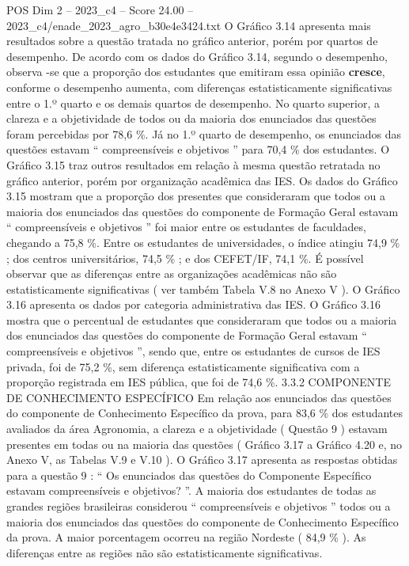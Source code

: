 \begin{textsample}{POS Dim 2 – 2023\_c4 – Score 24.00 – 2023\_c4/enade\_2023\_agro\_b30e4e3424.txt}
O Gráfico 3.14 apresenta mais resultados sobre a questão tratada no gráfico anterior, porém por quartos de desempenho.
De acordo com os dados do Gráfico 3.14, segundo o desempenho, observa -se que a proporção dos estudantes que emitiram essa opinião \textbf{cresce}, conforme o desempenho aumenta, com diferenças estatisticamente significativas entre o 1.º quarto e os demais quartos de desempenho.
No quarto superior, a clareza e a objetividade de todos ou da maioria dos enunciados das questões foram percebidas por 78,6 \%.
Já no 1.º quarto de desempenho, os enunciados das questões estavam “ compreensíveis e objetivos ” para 70,4 \% dos estudantes.
O Gráfico 3.15 traz outros resultados em relação à mesma questão retratada no gráfico anterior, porém por organização acadêmica das IES.
Os dados do Gráfico 3.15 mostram que a proporção dos presentes que consideraram que todos ou a maioria dos enunciados das questões do componente de Formação Geral estavam “ compreensíveis e objetivos ” foi maior entre os estudantes de faculdades, chegando a 75,8 \%.
Entre os estudantes de universidades, o índice atingiu 74,9 \% ; dos centros universitários, 74,5 \% ; e dos CEFET/IF, 74,1 \%.
É possível observar que as diferenças entre as organizações acadêmicas não são estatisticamente significativas ( ver também Tabela V.8 no Anexo V ).
O Gráfico 3.16 apresenta os dados por categoria administrativa das IES.
O Gráfico 3.16 mostra que o percentual de estudantes que consideraram que todos ou a maioria dos enunciados das questões do componente de Formação Geral estavam “ compreensíveis e objetivos ”, sendo que, entre os estudantes de cursos de IES privada, foi de 75,2 \%, sem diferença estatisticamente significativa com a proporção registrada em IES pública, que foi de 74,6 \%. 3.3.2 COMPONENTE DE CONHECIMENTO ESPECÍFICO Em relação aos enunciados das questões do componente de Conhecimento Específico da prova, para 83,6 \% dos estudantes avaliados da área Agronomia, a clareza e a objetividade ( Questão 9 ) estavam presentes em todas ou na maioria das questões ( Gráfico 3.17 a Gráfico 4.20 e, no Anexo V, as Tabelas V.9 e V.10 ).
O Gráfico 3.17 apresenta as respostas obtidas para a questão 9 : “ Os enunciados das questões do Componente Específico estavam compreensíveis e objetivos? ”.
A maioria dos estudantes de todas as grandes regiões brasileiras considerou “ compreensíveis e objetivos ” todos ou a maioria dos enunciados das questões do componente de Conhecimento Específico da prova.
A maior porcentagem ocorreu na região Nordeste ( 84,9 \% ).
As diferenças entre as regiões não são estatisticamente significativas.

\end{textsample}
